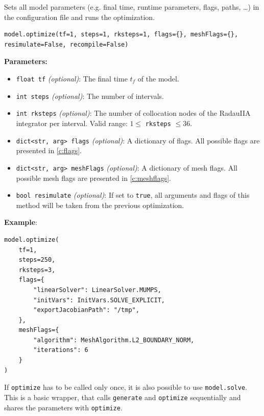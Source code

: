 \documentclass[12pt]{article}
\begin{document}
\begin{mdframed}[backgroundcolor=gray!10, roundcorner=10pt,
		linewidth=1pt]

	Sets all model parameters (e.g. final time, runtime parameters, flags,
	paths, \ldots) in the configuration file and runs the optimization.

	\begin{lstlisting}
model.optimize(tf=1, steps=1, rksteps=1, flags={}, meshFlags={}, resimulate=False, recompile=False)
	\end{lstlisting}
	\label{optimize}
	\textbf{Parameters:}
	\begin{itemize}
		\item \texttt{float tf} \emph{(optional)}: The final time $t_f$
		      of the model.
		\item \texttt{int steps} \emph{(optional)}: The number of
		      intervals.
		\item \texttt{int rksteps} \emph{(optional)}: The number of
		      collocation nodes of the RadauIIA integrator per
		      interval. Valid range: $1
			      \leq$ \texttt{rksteps} $\leq 36$.
		\item \texttt{dict<str, arg> flags} \emph{(optional)}: A
		      dictionary of flags. All possible flags are presented in
		      \eqref{c:flags}.
		\item \texttt{dict<str, arg> meshFlags} \emph{(optional)}: A
		      dictionary of mesh flags. All possible mesh flags are
		      presented in
		      \eqref{c:meshflags}.
		\item \texttt{bool resimulate} \emph{(optional)}: If set to
		      \texttt{true}, all arguments and flags of this method
		      will be taken from the
		      previous optimization.
	\end{itemize}

	\textbf{Example}:
	\begin{lstlisting}
model.optimize(
	tf=1,
	steps=250,
	rksteps=3,
	flags={
		"linearSolver": LinearSolver.MUMPS,
		"initVars": InitVars.SOLVE_EXPLICIT,
		"exportJacobianPath": "/tmp",
	},
	meshFlags={
		"algorithm": MeshAlgorithm.L2_BOUNDARY_NORM,
		"iterations": 6
	}
)
	\end{lstlisting}

\end{mdframed}

If \texttt{optimize} has to be called only once, it is also possible to use
\texttt{model.solve}. This is a basic wrapper, that calls \texttt{generate} and
\texttt{optimize} sequentially and shares the parameters with
\texttt{optimize}.
\end{document}
